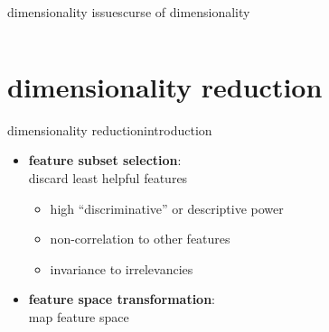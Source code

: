 \begin{frame}{dimensionality issues}{curse of dimensionality}
\begin{columns}
            \end{columns}
		\end{frame}

    \section[reduction]{dimensionality reduction}
		\begin{frame}{dimensionality reduction}{introduction}
			\begin{itemize}
				\item	\textbf{feature subset selection}:\\ discard least helpful features
                    \pause
                    \begin{itemize}
                        \item	high ``discriminative'' or descriptive power
                        \item	non-correlation to other features
                        \item	invariance to irrelevancies
                    \end{itemize}
				\bigskip
				\item<2->	\textbf{feature space transformation}:\\ map feature space
			\end{itemize}
		\end{frame}
        
